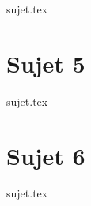 \documentclass[a4paper, 11pt]{book}
\begin{document}
\resetQ
{sujet.tex}

\newpage

\chapter{Sujet 5}

\resetQ
{sujet.tex}

\newpage

\chapter{Sujet 6}

\resetQ
{sujet.tex}
\end{document}
